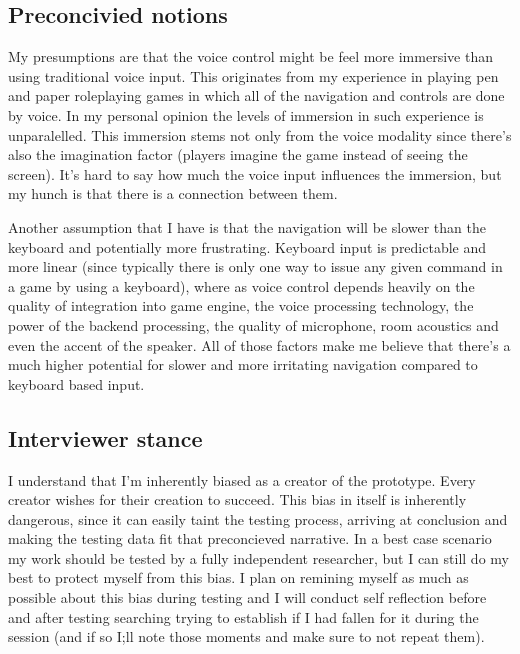 \subsection{Preconcivied notions}
My presumptions are that the voice control might be feel more immersive than using traditional voice input. This originates from my experience in playing pen and paper roleplaying 
games in which all of the navigation and controls are done by voice. In my personal opinion the levels of immersion in such experience is unparalelled. This immersion stems not only from the voice 
modality since there's also the imagination factor (players imagine the game instead of seeing the screen). It's hard to say how much the voice input influences the immersion, but my hunch is that there is a connection between them.

Another assumption that I have is that the navigation will be slower than the keyboard and potentially more frustrating. Keyboard input is predictable and more linear (since typically there is only one way to issue any given command in a game by using a keyboard), where as 
voice control depends heavily on the quality of integration into game engine, the voice processing technology, the power of the backend processing, 
the quality of microphone, room acoustics and even the accent of the speaker. All of those factors make me believe that there's a much higher potential for slower and more irritating
navigation compared to keyboard based input.  
\subsection{Interviewer stance}
I understand that I'm inherently biased as a creator of the prototype. Every creator wishes for their creation to succeed. This bias in itself is inherently dangerous, since it can easily taint the testing process, arriving at conclusion and making the testing data fit that preconcieved narrative. In a best case scenario my work should be tested by a fully independent researcher, but I can still do my best to protect myself from this bias. I plan on remining myself as much as possible about this bias during testing and I will conduct self reflection before and after testing searching trying to establish if I had fallen for it during the session (and if so I;ll note those moments and make sure to not repeat them). 
